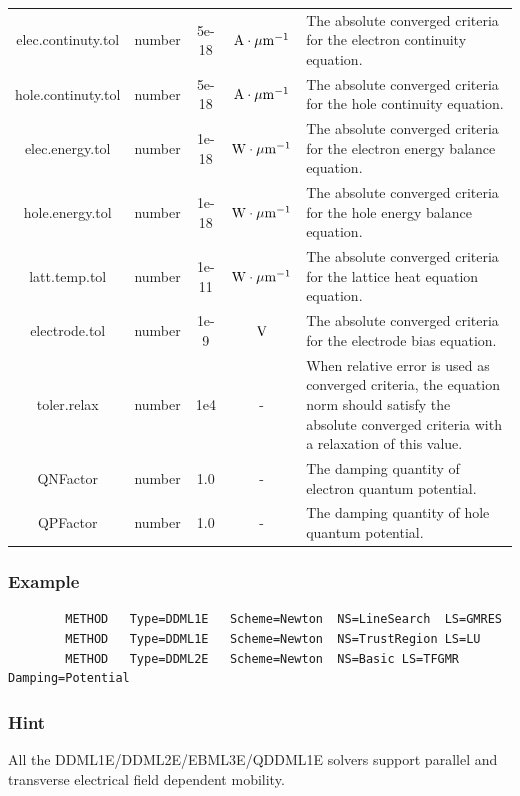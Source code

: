 \documentclass[11pt,pdftex]{article}
\begin{document}
\begin{longtable}{ccccp{7cm}}
elec.continuty.tol& number  & 5e-18       &$\rm{A\cdot {\mu m}^{-1}} $ & The absolute converged criteria for the electron continuity equation.\\
hole.continuty.tol& number  & 5e-18       &$\rm{A\cdot {\mu m}^{-1}} $ & The absolute converged criteria for the hole continuity equation.\\
elec.energy.tol   & number  & 1e-18       &$\rm{W\cdot {\mu m}^{-1}} $ & The absolute converged criteria for the electron energy balance equation.\\
hole.energy.tol   & number  & 1e-18       &$\rm{W\cdot {\mu m}^{-1}} $ & The absolute converged criteria for the hole energy balance equation.\\
latt.temp.tol     & number  & 1e-11       &$\rm{W\cdot {\mu m}^{-1}} $ & The absolute converged criteria for the lattice heat equation equation.\\
electrode.tol     & number  & 1e-9        &$\rm{V}$                    & The absolute converged criteria for the electrode bias equation.\\
toler.relax       & number  & 1e4         & -                          & When relative error is used as converged criteria, the equation norm should
                                                                         satisfy the absolute converged criteria with a relaxation of this value.\\
QNFactor          & number  & 1.0         & -                          & The damping quantity of electron quantum potential.\\
QPFactor          & number  & 1.0         & -                          & The damping quantity of hole quantum potential.\\
\end{longtable}
\normalsize

\subsubsection*{Example}
\begin{verbatim}
        METHOD   Type=DDML1E   Scheme=Newton  NS=LineSearch  LS=GMRES
        METHOD   Type=DDML1E   Scheme=Newton  NS=TrustRegion LS=LU
        METHOD   Type=DDML2E   Scheme=Newton  NS=Basic LS=TFGMR Damping=Potential
\end{verbatim}

\subsubsection*{Hint}
All the DDML1E/DDML2E/EBML3E/QDDML1E solvers support parallel and
transverse electrical field dependent mobility.
\end{document}
